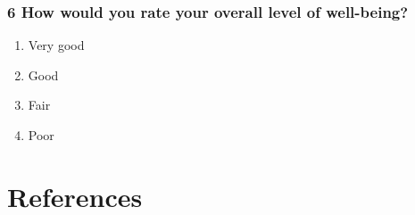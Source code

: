 \documentclass[
  letterpaper,
  DIV=11,
  numbers=noendperiod]{scrartcl}
\providecommand{\tightlist}{%
  \setlength{\itemsep}{0pt}\setlength{\parskip}{0pt}}\usepackage{longtable,booktabs,array}
\begin{document}
\hypertarget{how-would-you-rate-your-overall-level-of-well-being}{%
\subsubsection{6 How would you rate your overall level of
well-being?}\label{how-would-you-rate-your-overall-level-of-well-being}}

\begin{enumerate}
\def\labelenumi{\alph{enumi}.}
\tightlist
\item
  Very good
\item
  Good
\item
  Fair
\item
  Poor
\end{enumerate}

\newpage

\hypertarget{references}{%
\section*{References}\label{references}}
\end{document}
